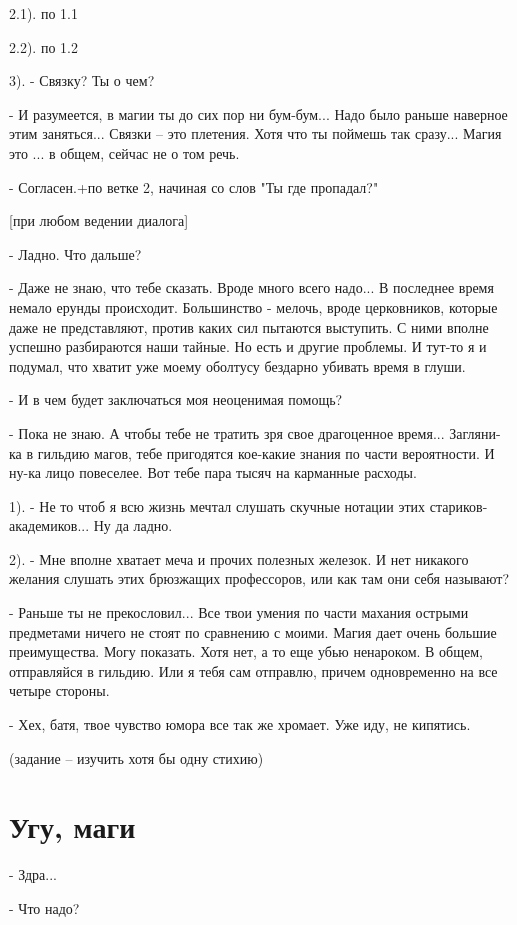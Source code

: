 \documentclass[12pt,a4paper]{book}
\begin{document}
2.1). по 1.1

2.2). по 1.2

3). - Связку? Ты о чем?

- И разумеется, в магии ты до сих пор ни бум-бум... Надо было раньше наверное этим заняться... Связки – это плетения. Хотя что ты поймешь так сразу... Магия это ... в общем, сейчас не о том речь.

- Согласен.+по ветке 2, начиная со слов "Ты где пропадал?"

[при любом ведении диалога]

- Ладно. Что дальше?

- Даже не знаю, что тебе сказать. Вроде много всего надо... В последнее время немало ерунды происходит. Большинство - мелочь, вроде церковников, которые даже не представляют, против каких сил пытаются выступить. С ними вполне успешно разбираются наши тайные. Но есть и другие проблемы. И тут-то я и подумал, что хватит уже моему оболтусу бездарно убивать время в глуши.

- И в чем будет заключаться моя неоценимая помощь?

- Пока не знаю. А чтобы тебе не тратить зря свое драгоценное время... Загляни-ка в гильдию магов, тебе пригодятся кое-какие знания по части вероятности. И ну-ка лицо повеселее. Вот тебе пара тысяч на карманные расходы.

1). - Не то чтоб я всю жизнь мечтал слушать скучные нотации этих стариков-академиков... Ну да ладно.

2). - Мне вполне хватает меча и прочих полезных железок. И нет никакого желания слушать этих брюзжащих профессоров, или как там они себя называют?

- Раньше ты не прекословил... Все твои умения по части махания острыми предметами ничего не стоят по сравнению с моими. Магия дает очень большие преимущества. Могу показать. Хотя нет, а то еще убью ненароком. В общем, отправляйся в гильдию. Или я тебя сам отправлю, причем одновременно на все четыре стороны.

- Хех, батя, твое чувство юмора все так же хромает. Уже иду, не кипятись.

(задание – изучить хотя бы одну стихию)

\section{Угу, маги}

- Здра...

- Что надо?
\end{document}

